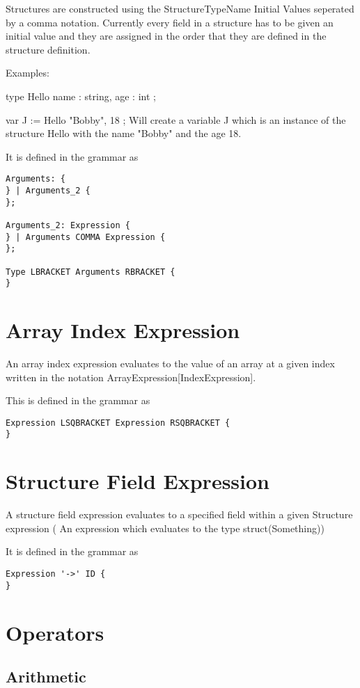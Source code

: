 \documentclass[]{final_report}
\begin{document}
Structures are constructed using the StructureTypeName { Initial Values seperated by a comma } notation. Currently every field in a structure has to be given an initial value and they are assigned in the order that they are defined in the structure definition.

Examples:

type Hello { 
	name : string,
	age : int
};

var J := Hello{ "Bobby", 18 };
Will create a variable J which is an instance of the structure Hello with the name "Bobby" and the age 18.

It is defined in the grammar as
\begin{verbatim}
Arguments: {
} | Arguments_2 {
};

Arguments_2: Expression {
} | Arguments COMMA Expression {
};

Type LBRACKET Arguments RBRACKET {
}
\end{verbatim}

\section{Array Index Expression}

An array index expression evaluates to the value of an array at a given index written in the notation ArrayExpression[IndexExpression].

This is defined in the grammar as \begin{verbatim}
Expression LSQBRACKET Expression RSQBRACKET {
}
\end{verbatim}

\section{Structure Field Expression}

A structure field expression evaluates to a specified field within a given Structure expression ( An expression which evaluates to the type struct(Something))

It is defined in the grammar as
\begin{verbatim}
Expression '->' ID {
}
\end{verbatim}

\section{Operators}

\subsection{Arithmetic}
\end{document}
